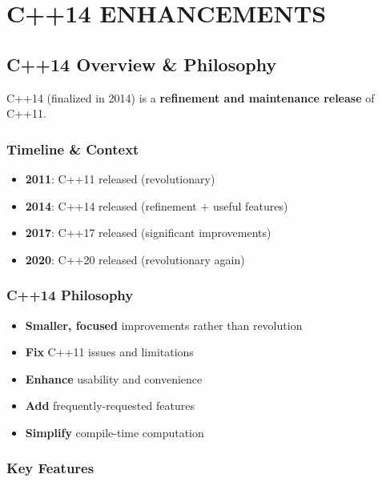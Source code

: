 \hypertarget{c14-enhancements}{%
\chapter{C++14 ENHANCEMENTS}\label{c14-enhancements}}

\hypertarget{c14-overview-philosophy}{%
\section{C++14 Overview \& Philosophy}\label{c14-overview-philosophy}}

C++14 (finalized in 2014) is a \textbf{refinement and maintenance
release} of C++11.

\hypertarget{timeline-context}{%
\subsection{Timeline \& Context}\label{timeline-context}}

\begin{itemize}
\tightlist
\item
  \textbf{2011}: C++11 released (revolutionary)
\item
  \textbf{2014}: C++14 released (refinement + useful features)
\item
  \textbf{2017}: C++17 released (significant improvements)
\item
  \textbf{2020}: C++20 released (revolutionary again)
\end{itemize}

\hypertarget{c14-philosophy}{%
\subsection{C++14 Philosophy}\label{c14-philosophy}}

\begin{itemize}
\tightlist
\item
  \textbf{Smaller, focused} improvements rather than revolution
\item
  \textbf{Fix} C++11 issues and limitations
\item
  \textbf{Enhance} usability and convenience
\item
  \textbf{Add} frequently-requested features
\item
  \textbf{Simplify} compile-time computation
\end{itemize}

\hypertarget{key-features}{%
\subsection{Key Features}\label{key-features}}


